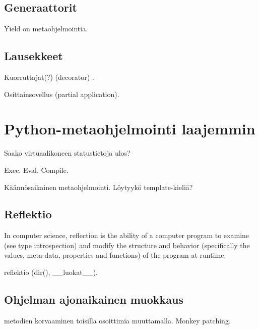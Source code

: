 \documentclass[finnish]{tktltiki2}
\theoremstyle{definition}
\theoremstyle{remark}
\begin{document}
\subsection{Generaattorit}


Yield on metaohjelmointia.

\subsection{Lausekkeet}

Kuorruttajat(?) (decorator) \cite{dubois2005nest}.

Osittainsovellus (partial application).



\section{Python-metaohjelmointi laajemmin}

Saako virtuaalikoneen statustietoja ulos?

Exec. Eval. Compile.

Käännösaikainen metaohjelmointi. Löytyykö template-kieliä?

\subsection{Reflektio}

In computer science, reflection is the ability of a computer program to examine (see type introspection) and modify the structure and behavior (specifically the values, meta-data, properties and functions) of the program at runtime.

reflektio (dir(), \_\_luokat\_\_). 




\subsection{Ohjelman ajonaikainen muokkaus}

metodien korvaaminen toisilla osoittimia muuttamalla. Monkey patching.
\end{document}
